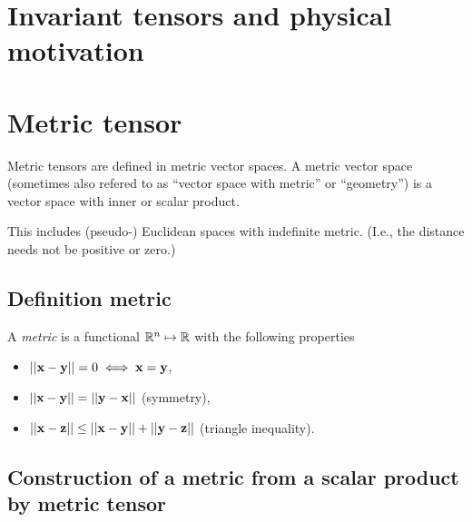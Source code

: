 \section{Invariant tensors and physical motivation}

\section{Metric tensor}

Metric tensors are defined in metric vector spaces.
A metric vector space (sometimes also refered to
as ``vector space with metric'' or ``geometry'')
is a vector space with inner or scalar product.

This includes (pseudo-) Euclidean spaces with indefinite metric.
(I.e., the distance needs not be positive or zero.)




\subsection{Definition metric}
\label{2011-m-metrict}

A {\em metric} is a functional ${\Bbb R}^n\mapsto {\Bbb R}$
with the following properties
\begin{itemize}
\item
$\vert\vert {\bf x} -{\bf y}  \vert\vert =0 \; \Longleftrightarrow \; {\bf x}  = {\bf y} $,
\item
$\vert\vert {\bf x} - {\bf y} \vert\vert  =\vert\vert {\bf y} - {\bf x}  \vert\vert $  (symmetry),
\item
$\vert\vert {\bf x} -{\bf z} \vert\vert  \le \vert\vert {\bf x} - {\bf y} \vert\vert  + \vert\vert  {\bf y} - {\bf z} \vert\vert $  (triangle
inequality).
\end{itemize}



\subsection{Construction of a metric from a scalar product by metric tensor}

